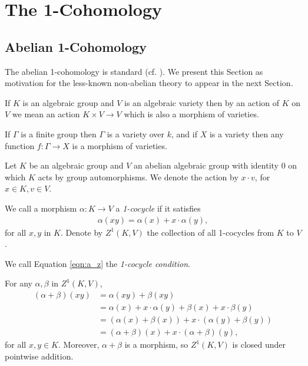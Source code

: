 
\chapter{The 1-Cohomology}
\label{Chapter3}

\section{Abelian 1-Cohomology}
The abelian 1-cohomology is standard (cf. \cite{brown1976cohomology}). We present this Section as motivation for the less-known non-abelian theory to appear in the next Section.

If $K$ is an algebraic group and $V$ is an algebraic variety then by an action of $K$ on $V$ we mean an action $K\times V\rightarrow V$ which is also a morphism of varieties.

If $\Gamma$ is a finite group then $\Gamma$ is a variety over $k$, and if $X$ is a variety then any function $f:\Gamma \rightarrow X$ is a morphism of varieties.

Let $K$ be an algebraic group and $V$ an abelian algebraic group with identity $0$ on which $K$ acts by group automorphisms. We denote the action by $x \cdot v$, for $x \in K, v \in V$.

\begin{definition} We call a morphism $\alpha: K\rightarrow V$ a \emph{1-cocycle} if it satisfies
	\begin{align}
		\alpha(xy) = \alpha(x) + x\cdot\alpha(y),
		\label{eqn:a_z}
	\end{align}
	for all $x, y$ in $K$. Denote by $Z^1\left( K, V \right)$ the collection of all 1-cocycles from $K$ to $V$.

	We call Equation \ref{eqn:a_z} the \emph{1-cocycle condition}.
\end{definition}

For any $\alpha, \beta$ in $Z^1\left(K, V\right)$,
\begin{align*}
	\left(\alpha + \beta\right)(xy) &=  \alpha(xy) +  \beta(xy) \\
	&=  \alpha(x) + x\cdot\alpha(y) +  \beta(x) + x\cdot\beta(y)\\
	&=  \left( \alpha(x) + \beta(x) \right) + x\cdot\left(\alpha(y) + \beta(y)\right) \\
	&=  \left(\alpha+\beta\right)(x) + x\cdot\left(\alpha + \beta\right)(y),
\end{align*}
for all $x,y \in K$. Moreover, $\alpha + \beta$ is a morphism, so $Z^1(K, V)$ is closed under pointwise addition.

